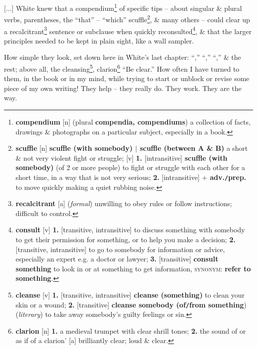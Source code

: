 \documentclass[oneside]{book}
\numberwithin{equation}{section}
\begin{document}
[$\ldots$] White knew that a compendium\footnote{\textbf{compendium} [n] (plural \textbf{compendia, compendiums}) a collection of facts, drawings \& photographs on a particular subject, especially in a book.} of specific tips -- about singular \& plural verbs, parentheses, the ``that'' -- ``which'' scuffle\footnote{\textbf{scuffle} [n] \textbf{scuffle (with somebody) $|$ scuffle (between A \& B)} a short \& not very violent fight or struggle; [v] \textbf{1.} [intransitive] \textbf{scuffle (with somebody)} (of 2 or more people) to fight or struggle with each other for a short time, in a way that is not very serious; \textbf{2.} [intransitive] \textbf{$+$ adv.\texttt{/}prep.} to move quickly making a quiet rubbing noise.}, \& many others -- could clear up a recalcitrant\footnote{\textbf{recalcitrant} [a] (\textit{formal}) unwilling to obey rules or follow instructions; difficult to control.} sentence or subclause when quickly reconsulted\footnote{\textbf{consult} [v] \textbf{1.} [transitive, intransitive] to discuss something with somebody to get their permission for something, or to help you make a decision; \textbf{2.} [transitive, intransitive] to go to somebody for information or advice, especially an expert e.g. a doctor or lawyer; \textbf{3.} [transitive] \textbf{consult something} to look in or at something to get information, \textsc{synonym}: \textbf{refer to something}.}, \& that the larger principles needed to be kept in plain sight, like a wall sampler.

How simple they look, set down here in White's last chapter: ``,'' ``,'' ``,'' \& the rest; above all, the cleansing\footnote{\textbf{cleanse} [v] \textbf{1.} [transitive, intransitive] \textbf{cleanse (something)} to clean your skin or a wound; \textbf{2.} [transitive] \textbf{cleanse somebody (of\texttt{/}from something}) (\textit{literary}) to take away somebody's guilty feelings or sin.}, clarion\footnote{\textbf{clarion} [n] \textbf{1.} a medieval trumpet with clear shrill tones; \textbf{2.} the sound of or as if of a clarion' [a] brilliantly clear; loud \& clear.} ``Be clear.'' How often I have turned to them, in the book or in my mind, while trying to start or unblock or revise some piece of my own writing! They help -- they really do. They work. They are the way.
\end{document}

